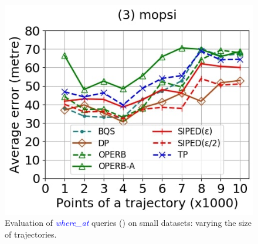 {\begin{figure}[tb!]
	\includegraphics[scale=0.250]{Figures/Exp-where-PED-error-size-mopsi.jpg}		
	\vspace{-2ex}
	\caption{\small Evaluation of \textcolor{blue}{\emph{where\_at}} queries (\ped) on small datasets: varying the size of
		trajectories.}
	\label{fig:query-ped-size}
	\vspace{-1ex}
\end{figure}

}
